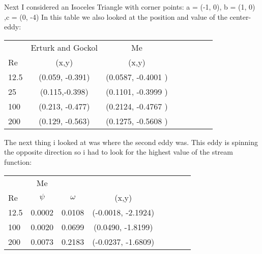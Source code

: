 \documentclass[a4paper,norsk]{article}
\begin{document}
\newline 
Next I considered an Isoceles Triangle with corner points: \newline
a = (-1, 0), b = (1, 0) ,c = (0, -4) \newline
\newline
In this table we also looked at the position and value of the center-eddy:
\newline
\begin{tabular}{l*{6}{c}r}
   & Erturk and Gockol & Me\\
  Re &(x,y) & (x,y)  \\
12.5 & (0.059, -0.391) & (0.0587, -0.4001 )\\
25 & (0.115,-0.398) &  (0.1101, -0.3999 )\\
100 & (0.213, -0.477)& (0.2124, -0.4767 ) \\
200 & (0.129, -0.563)& (0.1275, -0.5608 )\\  
\hline
\end{tabular}
The next thing i looked at was where the second eddy was. This eddy is spinning the opposite direction so i had to look for the highest value of the stream function:
\begin{tabular}{l*{6}{c}r}
   & Me\\
  Re & $\psi$ & $\omega$& (x,y)   \\
12.5 & 0.0002 & 0.0108 & (-0.0018, -2.1924)\\
100 & 0.0020 & 0.0699  & (0.0490, -1.8199)\\
200 &  0.0073 & 0.2183 & (-0.0237, -1.6809)\\
\hline
\end{tabular}
\end{document}
